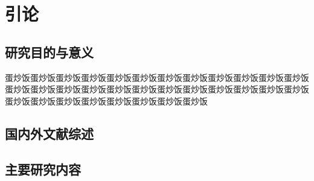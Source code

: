 \chapter*{引\hspace{1em}论}
{}
\section{研究目的与意义}
蛋炒饭蛋炒饭蛋炒饭蛋炒饭蛋炒饭蛋炒饭蛋炒饭蛋炒饭蛋炒饭蛋炒饭蛋炒饭蛋炒饭蛋炒饭蛋炒饭蛋炒饭蛋炒饭蛋炒饭蛋炒饭蛋炒饭蛋炒饭蛋炒饭蛋炒饭蛋炒饭蛋炒饭蛋炒饭蛋炒饭蛋炒饭蛋炒饭蛋炒饭蛋炒饭蛋炒饭蛋炒饭
\section{国内外文献综述}
\section{主要研究内容}